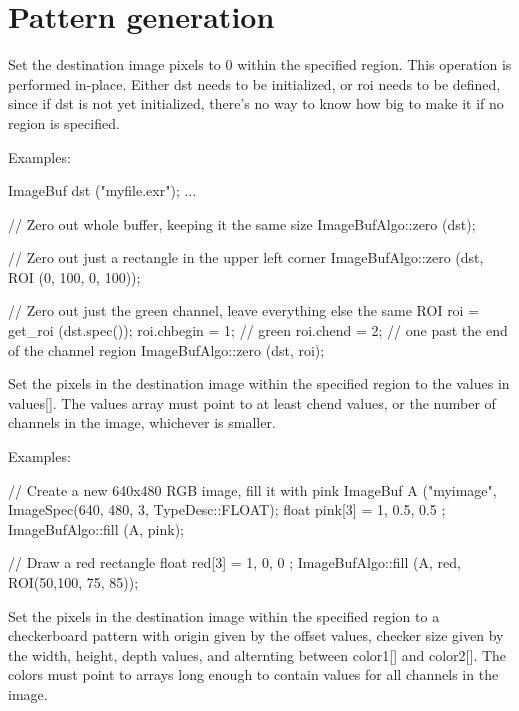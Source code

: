 \section{Pattern generation}
\label{sec:iba:patterns}

 
Set the destination image pixels to 0 within the specified region.
This operation is performed in-place.  Either {\cf dst} needs to
be initialized, or {\cf roi} needs to be defined, since if {\cf dst}
is not yet initialized, there's no way to know how big to make it if
no region is specified.

\smallskip
\noindent Examples:
\begin{code}
    ImageBuf dst ("myfile.exr");
    ...

    // Zero out whole buffer, keeping it the same size
    ImageBufAlgo::zero (dst);

    // Zero out just a rectangle in the upper left corner
    ImageBufAlgo::zero (dst, ROI (0, 100, 0, 100));

    // Zero out just the green channel, leave everything else the same
    ROI roi = get_roi (dst.spec());
    roi.chbegin = 1; // green
    roi.chend = 2;   // one past the end of the channel region
    ImageBufAlgo::zero (dst, roi);
\end{code}
\apiend

 
Set the pixels in the destination image within the specified region
to the values in {\cf values[]}.  The {\cf
  values} array must point to at least {\cf chend} values, or the
number of channels in the image, whichever is smaller.

\smallskip
\noindent Examples:
\begin{code}
    // Create a new 640x480 RGB image, fill it with pink
    ImageBuf A ("myimage", ImageSpec(640, 480, 3, TypeDesc::FLOAT);
    float pink[3] = { 1, 0.5, 0.5 };
    ImageBufAlgo::fill (A, pink);

    // Draw a red rectangle
    float red[3] = { 1, 0, 0 };
    ImageBufAlgo::fill (A, red, ROI(50,100, 75, 85));
\end{code}
\apiend


 
Set the pixels in the destination image within the specified region
to a checkerboard pattern with origin given by the {\cf offset} values,
checker size given by the {\cf width, height, depth} values, and 
alternting between {\cf color1[]} and {\cf color2[]}.  The colors must
point to arrays long enough to contain values for all channels in the
image.

